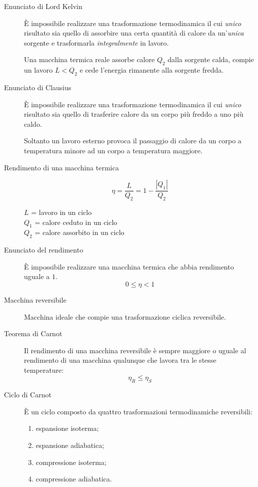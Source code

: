 \documentclass[a4paper,11pt,italian]{article}
\begin{document}
\begin{description}
  \item[Enunciato di Lord Kelvin] 
  È impossibile realizzare una trasformazione termodinamica il cui \emph{unico} risultato sia quello di assorbire una certa quantità di calore da un'\emph{unica} sorgente e trasformarla \emph{integralmente} in lavoro.
  
  Una macchina termica reale assorbe calore $ Q_2 $ dalla sorgente calda, compie un lavoro $ L< Q_2 $ e cede l'energia rimanente alla sorgente fredda.
  
  \item[Enunciato di Clausius] 
  È impossibile realizzare una trasformazione termodinamica il cui \emph{unico} risultato sia quello di trasferire calore da un corpo più freddo a uno più caldo.
   
   Soltanto un lavoro esterno provoca il passaggio di calore da un corpo a temperatura minore ad un corpo a temperatura maggiore.

  \item[Rendimento di una macchina termica]
  \[ \eta = \frac{L}{Q_2} = 1 - \frac{|Q_1|}{Q_2} \]
  \begin{multicols}{2}
  $ L $ = lavoro in un ciclo\\
  $ Q_1 $ = calore ceduto in un ciclo\\
  $ Q_2 $ = calore assorbito in un ciclo
  \end{multicols}
  
  \item[Enunciato del rendimento] 
  È impossibile realizzare una macchina termica che abbia rendimento uguale a $ 1 $.
  \[ 0 \leq \eta < 1 \]
  
  \item[Macchina reversibile] 
  Macchina ideale che compie una trasformazione ciclica reversibile.
  
  \item[Teorema di Carnot] 
  Il rendimento di una macchina reversibile è sempre maggiore o uguale al rendimento di una macchina qualunque che lavora tra le stesse temperature:
  \[ \eta_R \leq \eta_S \]
  
  \item[Ciclo di Carnot] 
  È un ciclo composto da quattro trasformazioni termodinamiche reversibili:
  \begin{multicols}{2}
  \begin{enumerate}
    \item espansione isoterma;
    \item espansione adiabatica;
    \item compressione isoterma;
    \item compressione adiabatica.
  \end{enumerate}
  \end{multicols}


\end{description}
\end{document}
